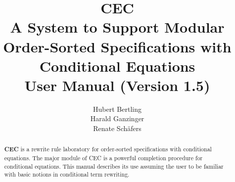 





\title{
{\bf CEC}\\
A System to Support Modular Order-Sorted Specifications
with Conditional Equations\\
User Manual (Version 1.5)}
\author{
Hubert Bertling\\
Harald Ganzinger\\
Renate Sch\"afers}


\maketitle

\begin{abstract}
{\bf CEC} is a rewrite rule laboratory for order-sorted specifications
with conditional equations. The major module of CEC is a powerful
completion procedure for conditional equations. This manual describes its 
use assuming the user to be familiar with basic notions in
conditional term rewriting.
\end{abstract}

\setcounter{page}{1}
\tableofcontents

\newpage

\setcounter{page}{1}






\newpage



\newpage

\appendix
